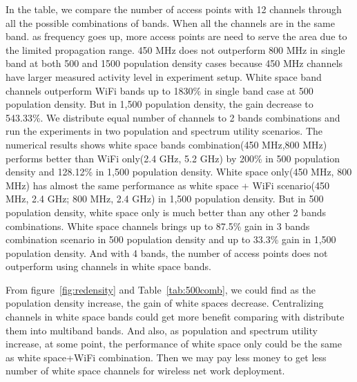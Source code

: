 In the table, we compare the number of access points with 12 channels through all 
the possible combinations of bands. 
When all the channels are in the same band. as frequency goes up, more access 
points are need to serve the area due to the limited propagation range. 
450 MHz does not outperform 800 MHz in single band at both 500 and 1500 population
density cases because 450 MHz channels have larger measured activity level in experiment setup. 
White space band channels outperform WiFi bands up to 1830\% in single band case
at 500 population density. But in 1,500 population density, the gain decrease to 543.33\%.
We distribute equal number of channels to 2 bands combinations and run the experiments in 
two population and spectrum utility scenarios. The numerical results shows white space bands 
combination(450 MHz,800 MHz) performs better than WiFi only(2.4 GHz, 5.2 GHz) by 200\% in 
500 population density and 128.12\% in 1,500 population density. 
White space only(450 MHz, 800 MHz) has almost the same performance as white space + WiFi 
scenario(450 MHz, 2.4 GHz; 800 MHz, 2.4 GHz) in 1,500 population density. But in 500 population
density, white space only is much better than any other 2 bands combinations.
White space channels brings up to 87.5\% gain in 3 bands combination scenario in 500 population
density and up to 33.3\% gain in 1,500 population density. And with 4 bands, the number of 
access points does not outperform using channels in white space bands.

From figure~\ref{fig:redensity} and Table~\ref{tab:500comb}, we could find as the population
density increase, the gain of white spaces decrease. Centralizing channels in white space
bands could get more benefit comparing with distribute them into multiband bands.
And also, as population and spectrum utility increase, at some point, the performance of
white space only could be the same as white space+WiFi combination. Then we may pay
less money to get less number of white space channels for wireless net work deployment.

